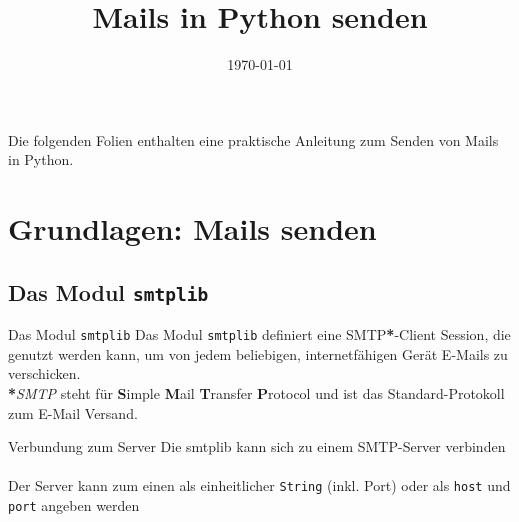 


\newcommand{\topic}{
	Mails in Python senden
}

\title{\topic}
\supertitle{\course}
\date{\today}



\maketitle

\begin{frame}
	\tableofcontents
\end{frame}


\begin{frame}
	Die folgenden Folien enthalten eine praktische Anleitung zum Senden von Mails in Python.
\end{frame}


\section{Grundlagen: Mails senden}
\subsection{Das Modul \texttt{smtplib}}
\begin{frame}[fragile]{Das Modul \texttt{smtplib}}
	Das Modul \texttt{smtplib} definiert eine SMTP\textbf{*}-Client Session, die genutzt werden kann, um von jedem beliebigen, internetf\"ahigen Ger\"at E-Mails zu verschicken. \\[1cm]
	
	\textbf{*}\textit{SMTP} steht für \textbf{S}imple \textbf{M}ail \textbf{T}ransfer 
	\textbf{P}rotocol und ist das Standard-Protokoll zum E-Mail Versand.
\end{frame}

\begin{frame}[fragile]{Verbundung zum Server}
	Die smtplib kann sich zu einem SMTP-Server verbinden\\[.5cm]
	
	
	\ \\[.25cm]
	Der Server kann zum einen als einheitlicher \texttt{String} (inkl. Port) oder als \texttt{host} und \texttt{port} angeben werden
\end{frame}

